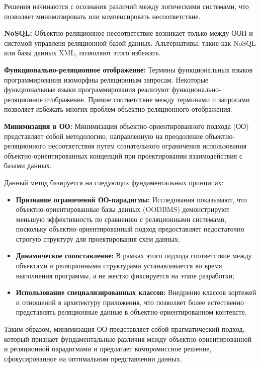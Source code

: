 
        Решения начинаются с осознания различий между логическими системами, что позволяет минимизировать или компенсировать несоответствие.

        \textbf{NoSQL:}
            Объектно-реляционное несоответствие возникает только между ООП и системой управленя реляционной базой данных. Альтернативы, такие как NoSQL или базы данных XML, позволяют этого избежать.

        \textbf{Функционально-реляционное отображение:}
            Термины функциональных языков программирования изоморфны реляционным запросам. Некоторые функциональные языки программирования реализуют функционально-реляционное отображение. Прямое соответствие между терминами и запросами позволяет избежать многих проблем объектно-реляционного отображения.

        \textbf{Минимизация в ОО:}
            Минимизация объектно-ориентированного подхода (ОО) представляет собой методологию, направленную на преодоление объектно-реляционного несоответствия путем сознательного ограничения использования объектно-ориентированных концепций при проектировании взаимодействия с базами данных.

            Данный метод базируется на следующих фундаментальных принципах:

            \begin{itemize}
                \item \textbf{Признание ограничений ОО-парадигмы:} Исследования показывают, что объектно-ориентированные базы данных (OODBMS) демонстрируют меньшую эффективность по сравнению с реляционными системами, поскольку объектно-ориентированный подход предоставляет недостаточно строгую структуру для проектирования схем данных;
                
                \item \textbf{Динамическое сопоставление:} В рамках этого подхода соответствие между объектами и реляционными структурами устанавливается во время выполнения программы, а не жестко фиксируется на этапе разработки;
                
                \item \textbf{Использование специализированных классов:} Внедрение классов кортежей и отношений в архитектуру приложения, что позволяет более естественно представлять реляционные данные в объектно-ориентированном контексте.
            \end{itemize}

            Таким образом, минимизация ОО представляет собой прагматический подход, который признает фундаментальные различия между объектно-ориентированной и реляционной парадигмами и предлагает компромиссное решение, сфокусированное на оптимальном представлении данных.
